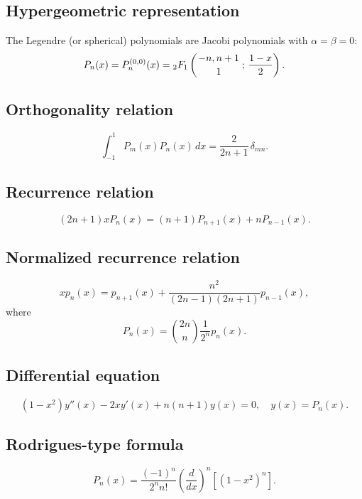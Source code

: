 \documentclass[envcountchap,graybox]{svmono}
\newcommand{\hyp}[5]{\mbox{}_{#1}{F}_{#2}
\left(\genfrac{}{}{0pt}{}{#3}{#4}\,;\,#5\right)}
\begin{document}
\par

\subsection*{Hypergeometric representation}
The Legendre (or spherical) polynomials are Jacobi polynomials with $\alpha=\beta=0$:
\begin{equation}
\label{DefLegendre}
P_n(x)=P_n^{(0,0)}(x)=\hyp{2}{1}{-n,n+1}{1}{\frac{1-x}{2}}.
\end{equation}

\subsection*{Orthogonality relation}
\begin{equation}
\label{OrtLegendre}
\int_{-1}^1P_m(x)P_n(x)\,dx=\frac{2}{2n+1}\,\delta_{mn}.
\end{equation}

\subsection*{Recurrence relation}
\begin{equation}
\label{RecLegendre}
(2n+1)xP_n(x)=(n+1)P_{n+1}(x)+nP_{n-1}(x).
\end{equation}

\subsection*{Normalized recurrence relation}
\begin{equation}
\label{NormRecLegendre}
xp_n(x)=p_{n+1}(x)+\frac{n^2}{(2n-1)(2n+1)}p_{n-1}(x),
\end{equation}
where
$$P_n(x)=\binom{2n}{n}\frac{1}{2^n}p_n(x).$$

\subsection*{Differential equation}
\begin{equation}
\label{dvLegendre}
(1-x^2)y''(x)-2xy'(x)+n(n+1)y(x)=0,\quad y(x)=P_n(x).
\end{equation}

\subsection*{Rodrigues-type formula}
\begin{equation}
\label{RodLegendre}
P_n(x)=\frac{(-1)^n}{2^nn!}\left(\frac{d}{dx}\right)^n\left[(1-x^2)^n\right].
\end{equation}
\end{document}

